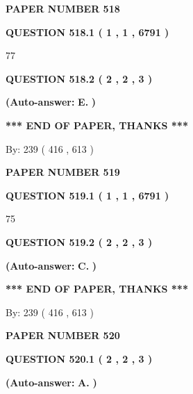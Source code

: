 \documentclass{ctexart}
\begin{document}
   
\newpage 
\setcounter{page}{ 
   518001 } 
   
   
 {\textbf{ \Large{ PAPER NUMBER  518  }}}
   
   
   
   
  
  
{\textbf{\large{QUESTION
518.1 
 ( 1 , 1 , 6791 )
}}}

77
  
  
{\textbf{\large{QUESTION
518.2 
 ( 2 , 2 , 3 )
}}}
 
 
{\textbf{(Auto-answer:}}
{\textbf{\large{
E.}}}
{\textbf{)}}
 
 
   
   
   
   
\vspace{1.0in} 
{\textbf{\large{ *** END OF PAPER, THANKS *** }}} 
   
   
\hspace{1.0in} By: 
 239 ( 416 ,  613 )
   
   
   
   
\newpage 
\setcounter{page}{ 
   519001 } 
   
   
 {\textbf{ \Large{ PAPER NUMBER  519  }}}
   
   
   
   
  
  
{\textbf{\large{QUESTION
519.1 
 ( 1 , 1 , 6791 )
}}}

75
  
  
{\textbf{\large{QUESTION
519.2 
 ( 2 , 2 , 3 )
}}}
 
 
{\textbf{(Auto-answer:}}
{\textbf{\large{
C.}}}
{\textbf{)}}
 
 
   
   
   
   
\vspace{1.0in} 
{\textbf{\large{ *** END OF PAPER, THANKS *** }}} 
   
   
\hspace{1.0in} By: 
 239 ( 416 ,  613 )
   
   
   
   
\newpage 
\setcounter{page}{ 
   520001 } 
   
   
 {\textbf{ \Large{ PAPER NUMBER  520  }}}
   
   
   
   
  
  
{\textbf{\large{QUESTION
520.1 
 ( 2 , 2 , 3 )
}}}
 
 
{\textbf{(Auto-answer:}}
{\textbf{\large{
A.}}}
{\textbf{)}}
 
 
  
\end{document}
